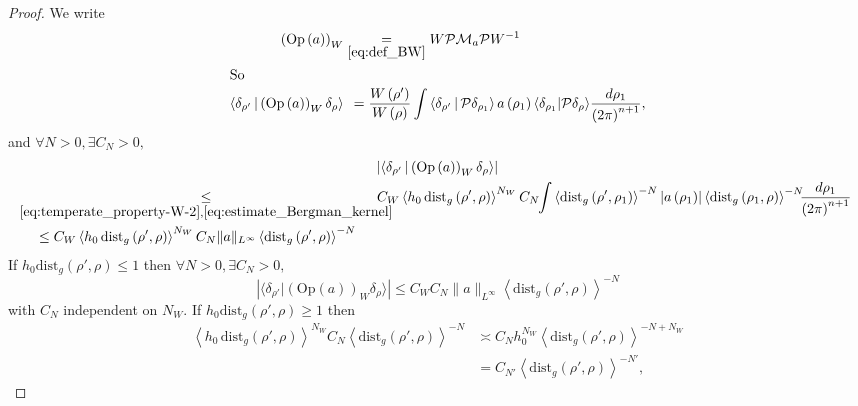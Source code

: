 \documentclass[AHL,Unicode,longabstracts,published]{cedram}
\newcommand{\clM}{\mathcal{M}}
\newcommand{\clP}{\mathcal{P}}
\newcommand{\dist}{\mathrm{dist}}
\newcommand{\Opp}{\mathrm{Op}}
\let\oldexists\exists
\renewcommand*{\exists}{\mathrel{\oldexists}}
\let\oldforall\forall
\renewcommand*{\forall}{\mathrel{\oldforall}}
\begin{document}
\begin{proof}
We write
\begin{align*}
\left(\Opp \left(a\right)\right)_{W}&\underset{\eqref{eq:def_BW}}{=} W\clP \clM_{a}\clP W^{-1}
\\
\intertext{So}
\left\langle\delta_{\rho'}\,\middle|\, \left(\Opp \left(a\right)\right)_{W}\delta_{\rho}\right\rangle &\mkern8mu=\frac{W\left(\rho'\right)}{W\left(\rho\right)}\int\left\langle\delta_{\rho'}\,\middle|\,\clP \delta_{\rho_{1}}\right\rangle a\left(\rho_{1}\right)\langle\delta_{\rho_{1}}|\clP \delta_{\rho}\rangle\frac{d\rho_{1}}{\left(2\pi\right)^{n+1}},
\end{align*}
and $\forall N>0,\exists C_{N}>0,$
\begin{multline*}
\left|\langle\delta_{\rho'}\,\middle|\,\left(\Opp \left(a\right)\right)_{W}\delta_{\rho}\rangle\right|\\
\begin{aligned}
&\mkern-10mu\underset{\eqref{eq:temperate_property-W-2},\eqref{eq:estimate_Bergman_kernel}}{\leq}\mkern-25mu C_{W}\left\langle h_{0}\,\dist_{g}\left(\rho',\rho\right)\right\rangle ^{N_{W}}C_{N}\mkern-5mu
\int\left\langle \dist_{g}\left(\rho',\rho_{1}\right)\right\rangle ^{-N}\left|a\left(\rho_{1}\right)\right|\left\langle \dist_{g}\left(\rho_{1},\rho\right)\right\rangle ^{-N}\mkern-8mu\frac{d\rho_{1}}{\left(2\pi\right)^{n+1}}\\
&\mkern15mu\leq  C_{W}\left\langle h_{0}\,\dist_{g}\left(\rho',\rho\right)\right\rangle ^{N_{W}}C_{N}\|a\|_{L^{\infty}}\left\langle \dist_{g}\left(\rho',\rho\right)\right\rangle ^{-N}
\end{aligned}
\end{multline*}
If $h_{0}\dist_{g}(\rho',\rho)\leq1$ then $\forall N>0,\exists C_{N}>0,$
\[
\left|\langle\delta_{\rho'}|\left(\Opp \left(a\right)\right)_{W}\delta_{\rho}\rangle\right|\leq C_{W}C_{N}\|a\|_{L^{\infty}}\left\langle \dist_{g}\left(\rho',\rho\right)\right\rangle ^{-N}
\]
with $C_{N}$ independent on $N_{W}$. If $h_{0}\dist_{g}(\rho',\rho)\geq1$ then
\begin{equation}\label{eq:aide}
\begin{split}
\left\langle h_{0}\,\dist_{g}\left(\rho',\rho\right)\right\rangle ^{N_{W}}C_{N}\left\langle \dist_{g}\left(\rho',\rho\right)\right\rangle ^{-N} & \asymp C_{N}h_{0}^{N_{W}}\left\langle \dist_{g}\left(\rho',\rho\right)\right\rangle ^{-N+N_{W}}
\\
& =C_{N'}\left\langle \dist_{g}\left(\rho',\rho\right)\right\rangle ^{-N'},
\end{split}

\end{equation}
\end{proof}
\end{document}
